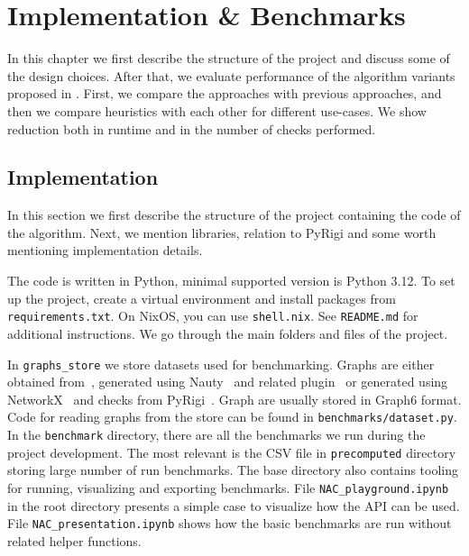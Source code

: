 \chapter{Implementation \& Benchmarks}%
\label{chapter:benchmarks}

\begin{chapterabstract}

	In this chapter we first describe the structure of the project
	and discuss some of the design choices.
	After that, we evaluate performance of the algorithm
	variants proposed in .
	First, we compare the approaches with previous approaches,
	and then we compare heuristics with each other
	for different use-cases.
	We show reduction both in runtime and in the number
	of \IsNACColoring{} checks performed.

\end{chapterabstract}

\section{Implementation}


In this section we first describe the structure of the project containing
the code of the algorithm.
Next, we mention libraries, relation to PyRigi and
some worth mentioning implementation details.

The code is written in Python, minimal supported version is Python 3.12.
To set up the project, create a virtual environment and install packages
from \texttt{requirements.txt}. On NixOS, you can use \texttt{shell.nix}.
See \texttt{README.md} for additional instructions.
We go through the main folders and files of the project.

In \texttt{graphs\_store} we store datasets used for benchmarking.
Graphs are either obtained from~\cite{extremal_graphs},
generated using Nauty~\cite{nauty} and related plugin~\cite{nauty_plugin}
or generated using NetworkX~\cite{networkx} and checks from PyRigi~\cite{pyrigi}.
Graph are usually stored in Graph6 format.
Code for reading graphs from the store can be found in \texttt{benchmarks/dataset.py}.
In the \texttt{benchmark} directory, there are all the benchmarks we run
during the project development. The most relevant is the CSV file
in \texttt{precomputed} directory storing large number of run benchmarks.
The base directory also contains tooling for running, visualizing and exporting benchmarks.
File \texttt{NAC\_playground.ipynb} in the root directory presents a simple case
to visualize how the API can be used.
File \texttt{NAC\_presentation.ipynb} shows how the basic benchmarks are run
without related helper functions.

